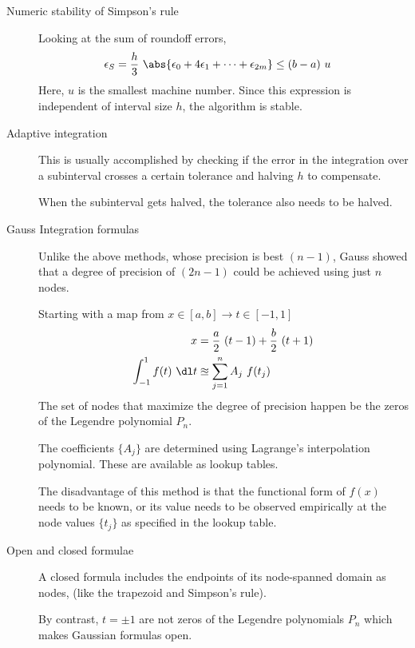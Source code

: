 \begin{description}
    \item[Numeric stability of Simpson's rule] Looking at the sum of roundoff errors,
        \begin{align}
            \epsilon_S & = \frac{h}{3}\ \abs{\epsilon_0 + 4\epsilon_1 + \dots
                + \epsilon_{2m}} \leq (b-a)\ u
        \end{align}
        Here, $ u $ is the smallest machine number. Since this expression is independent
        of interval size $ h $, the algorithm is stable. \par

    \item[Adaptive integration] This is usually accomplished by checking if the error
        in the integration over a subinterval crosses a certain tolerance and halving
        $ h $ to compensate. \par
        When the subinterval gets halved, the tolerance also needs to be halved.

    \item[Gauss Integration formulas] Unlike the above methods, whose precision is
        best $ (n-1) $, Gauss showed that a degree of precision of $ (2n-1) $ could be
        achieved using just $ n $ nodes. \par
        Starting with a map from $ x \in [a,b] \to t \in [-1, 1] $
        \begin{align}
            x                         & = \frac{a}{2}\ (t-1) + \frac{b}{2}\ (t+1) \\
            \int_{-1}^{1} f(t)\ \dl t & \approxeq \sum_{j = 1}^{n} A_j\ f(t_j)
        \end{align}
        The set of nodes that maximize the degree of precision happen be the zeros of
        the Legendre polynomial $ P_n $. \par
        The coefficients $ \{A_j\} $ are determined using Lagrange's interpolation
        polynomial. These are available as lookup tables. \par
        The disadvantage of this method is that the functional form of $ f(x) $ needs
        to be known, or its value needs to be observed empirically at the node values
        $ \{t_j\} $ as specified in the lookup table.

    \item[Open and closed formulae] A closed formula includes the endpoints of its
        node-spanned domain as nodes, (like the trapezoid and Simpson's rule). \par
        By contrast, $ t = \pm 1 $ are not zeros of the Legendre polynomials $ P_n $
        which makes Gaussian formulas open.


\end{description}
